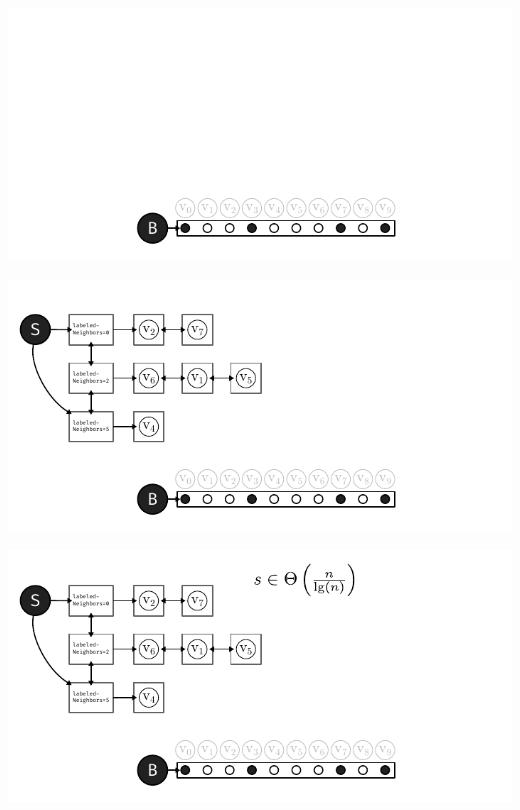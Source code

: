 \documentclass[xcolor=x11names,compress]{beamer}
\begin{document}
\bgroup
{}
\begin{frame}
	\begin{overprint}
		\begin{center}
			\includegraphics[scale=1.0]{img/execution/weirdtime/01.pdf}
		\end{center}
		\begin{center}
			\includegraphics[scale=1.0]{img/execution/weirdtime/02.pdf}
		\end{center}
		\begin{center}
			\includegraphics[scale=1.0]{img/execution/weirdtime/03.pdf}

\end{center}
\end{overprint}
\end{frame}
\end{document}
